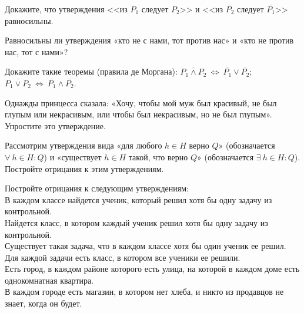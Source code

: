 \documentclass[a4paper,11pt]{article}
\newcommand{\0}[1]{\overline{#1}}
\begin{document}

 Докажите, что утверждения <<из $P_1$ следует $P_2$>> и <<из $\overline{P_2}$ следует $\overline{P_1}$>> равносильны.


 Равносильны ли утверждения «кто не с нами, тот против нас» и «кто не против нас, тот с нами»?

Докажите такие теоремы (правила де Моргана):
 $\overline{P_1 \wedge P_2}\ \Leftrightarrow\ \overline{P_1} \vee\overline{P_2}$;
 $\overline{P_1 \vee P_2}\  \Leftrightarrow\ \overline{P_1} \wedge \overline{P_2}$.

 Однажды принцесса сказала: «Хочу, чтобы мой муж был красивый, не был глупым или некрасивым, или чтобы был некрасивым, но не был глупым». Упростите это утверждение.

 Рассмотрим утверждения вида «для любого $h\in H$ верно $Q$» (обозначается $\forall\ h\in H : Q$) и «существует $h\in H$ такой, что верно $Q$» (обозначается $\exists\ h\in H : Q$). Постройте отрицания к этим утверждениям.





 Постройте отрицания к следующим утверждениям:\\
 В каждом классе найдется ученик, который решил хотя бы одну задачу из контрольной.\\
 Найдется класс, в котором каждый ученик решил хотя бы одну задачу из контрольной.\\
 Существует такая задача, что в каждом классе хотя бы один ученик ее решил.\\
 Для каждой задачи есть класс, в котором все ученики ее решили.\\
 Есть город, в каждом районе которого есть улица, на которой в каждом доме есть однокомнатная квартира.\\
 В каждом городе есть магазин, в котором нет хлеба, и никто из продавцов не знает, когда он будет.
\end{document}
